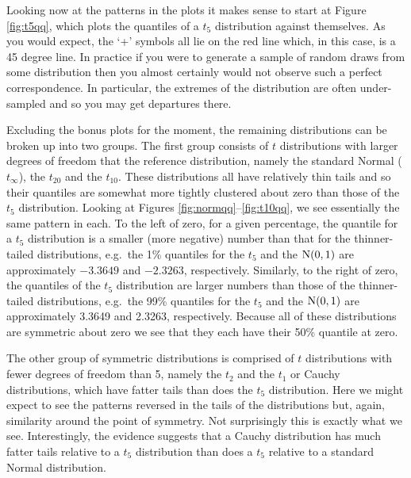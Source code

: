 Looking now at the patterns in the plots it makes sense to start at Figure \ref{fig:t5qq}, which
plots the quantiles of a \( t_{5} \) distribution against themselves.  As you would expect, the `+'
symbols all lie on the red line which, in this case, is a 45 degree line.  In practice if you were
to generate a sample of random draws from some distribution then you almost certainly would not
observe such a perfect correspondence.  In particular, the extremes of the distribution are often
under-sampled and so you may get departures there.

Excluding the bonus plots for the moment, the remaining distributions can be broken up into two
groups.  The first group consists of \( t \) distributions with larger degrees of freedom that the
reference distribution, namely the standard Normal (\( t_{\infty} \)), the \( t_{20} \) and the \(
t_{10} \).  These distributions all have relatively thin tails and so their quantiles are somewhat
more tightly clustered about zero than those of the \( t_{5} \) distribution.  Looking at Figures
\ref{fig:normqq}--\ref{fig:t10qq}, we see essentially the same pattern in each.  To the left of
zero, for a given percentage, the quantile for a \( t_{5} \) distribution is a smaller (more
negative) number than that for the thinner-tailed distributions, e.g.\ the 1\% quantiles for the \(
t_{5} \) and the \( \operatorname{N}(0,1) \) are approximately \( -3.3649 \) and \( -2.3263 \), respectively.
Similarly, to the right of zero, the quantiles of the \( t_{5} \) distribution are larger numbers
than those of the thinner-tailed distributions, e.g.\ the 99\% quantiles for the \( t_{5} \) and the
\( \operatorname{N}(0,1) \) are approximately 3.3649 and 2.3263, respectively.  Because all of these distributions
are symmetric about zero we see that they each have their 50\% quantile at zero.

The other group of symmetric distributions is comprised of \( t \) distributions with fewer degrees
of freedom than 5, namely the \( t_{2} \) and the \( t_{1} \) or Cauchy distributions, which have
fatter tails than does the \( t_{5} \) distribution.  Here we might expect to see the patterns
reversed in the tails of the distributions but, again, similarity around the point of symmetry.  Not
surprisingly this is exactly what we see.  Interestingly, the evidence suggests that a Cauchy
distribution has much fatter tails relative to a \( t_{5} \) distribution than does a \( t_{5} \)
relative to a standard Normal distribution.

